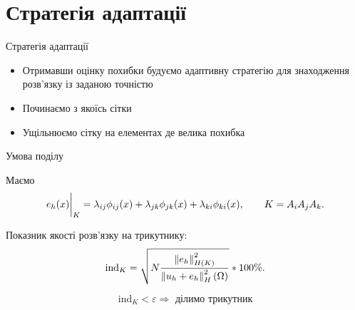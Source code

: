 
\section{Стратегія адаптації}
\frame{\sectionpage}

\begin{frame}{Стратегія адаптації}

	\begin{itemize}
		\item Отримавши оцінку похибки будуємо адаптивну стратегію для знаходження розв'язку із заданою точністю
		\item Починаємо з якоїсь сітки
		\item Ущільнюємо сітку на елементах де велика похибка
	\end{itemize}

\end{frame}

\begin{frame}{Умова поділу}

	Маємо
	\begin{equation}\label{eq:error_element}
		e_h(x)\bigg|_K = \lambda_{ij} \phi_{ij}(x)+\lambda_{jk} \phi_{jk}(x)+\lambda_{ki} \phi_{ki}(x), \qquad K = A_iA_jA_k.
	\end{equation}

	Показник якості розв'язку на трикутнику:
	\begin{equation}\label{eq:error_indicator}
		\text{ind}_K = \sqrt{N \frac
				{\left\lVert e_h\right\rVert^2_{H(K)}}
				{\left\lVert u_h+e_h\right\rVert^2_H(\Omega)}
		}*100\%.
	\end{equation}

	\begin{equation*}\label{eq:error_indicator}
		\text{ind}_K < \varepsilon \Rightarrow \text{ ділимо трикутник}
	\end{equation*}

\end{frame}

\undeff{\error}
